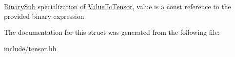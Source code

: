 \hyperlink{classtensor_1_1BinarySub}{Binary\+Sub} specialization of \hyperlink{structtensor_1_1ValueToTensor}{Value\+To\+Tensor}, {\ttfamily value} is a const reference to the provided binary expression 

The documentation for this struct was generated from the following file\+:\begin{DoxyCompactItemize}
\item 
include/tensor.\+hh\end{DoxyCompactItemize}
